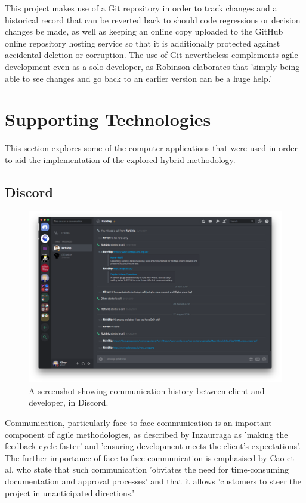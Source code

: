 This project makes use of a Git repository in order to track changes and a historical record that can be reverted back to should code regressions or decision changes be made, as well as keeping an online copy uploaded to the GitHub online repository hosting service so that it is additionally protected against accidental deletion or corruption. The use of Git nevertheless complements agile development even as a solo developer, as Robinson elaborates that 'simply being able to see changes and go back to an earlier version can be a huge help.' \cite{Robinson1}

\section{Supporting Technologies}
This section explores some of the computer applications that were used in order to aid the implementation of the explored hybrid methodology.

\subsection{Discord}
\begin{figure}[h]
    \includegraphics[width=\textwidth]{Figures/discord}
    \caption{A screenshot showing communication history between client and developer, in Discord.}
    \label{fig:discord1}
\end{figure}

Communication, particularly face-to-face communication is an important component of agile methodologies, as described by Inzaurraga as 'making the feedback cycle faster' and 'ensuring development meets the client's expectations'. \cite{Inzaurraga1} The further importance of face-to-face communication is emphasised by Cao et al, who state that such communication 'obviates the need for time-consuming documentation and approval processes' and that it allows 'customers to steer the project in unanticipated directions.' \cite{4420071}

